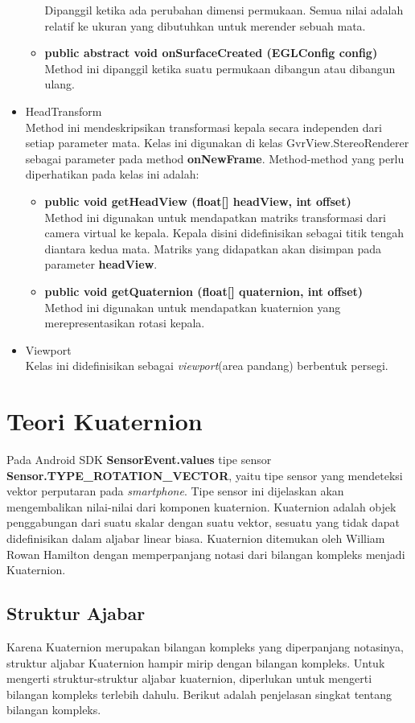 \begin{itemize}
\begin{itemize}
	Dipanggil ketika ada perubahan dimensi permukaan. Semua nilai adalah relatif ke ukuran yang dibutuhkan untuk merender sebuah mata.
	\item \textbf{public abstract void onSurfaceCreated (EGLConfig config)}\\
	Method ini dipanggil ketika suatu permukaan dibangun atau dibangun ulang.
\end{itemize}
\item HeadTransform\\
	Method ini mendeskripsikan transformasi kepala secara independen dari setiap parameter mata. Kelas ini digunakan di kelas GvrView.StereoRenderer sebagai parameter pada method \textbf{onNewFrame}. Method-method yang perlu diperhatikan pada kelas ini adalah:
	\begin{itemize}
		\item \textbf{public void getHeadView (float[] headView, int offset)}\\
		Method ini digunakan untuk mendapatkan matriks transformasi dari camera virtual ke kepala. Kepala disini didefinisikan sebagai titik tengah diantara kedua mata. Matriks yang didapatkan akan disimpan pada parameter \textbf{headView}.
		\item \textbf{public void getQuaternion (float[] quaternion, int offset)}\\
		Method ini digunakan untuk mendapatkan kuaternion yang merepresentasikan rotasi kepala.
	\end{itemize}
	\item Viewport\\
	Kelas ini didefinisikan sebagai \textit{viewport}(area pandang) berbentuk persegi.
\end{itemize}
\section{Teori Kuaternion}
\label{sec:teori_quaternion}

Pada Android SDK \textbf{SensorEvent.values} \cite{android_developers} tipe sensor \textbf{Sensor.TYPE\_ROTATION\_VECTOR}, yaitu tipe sensor yang mendeteksi vektor perputaran pada \textit{smartphone}. Tipe sensor ini dijelaskan akan mengembalikan nilai-nilai dari komponen kuaternion. 
Kuaternion\cite{kuipers:1999} adalah objek penggabungan dari suatu skalar dengan suatu vektor, sesuatu yang tidak dapat didefinisikan dalam aljabar linear biasa. Kuaternion ditemukan oleh William Rowan Hamilton dengan memperpanjang notasi dari bilangan kompleks menjadi Kuaternion. 
\subsection{Struktur Ajabar}
Karena Kuaternion merupakan bilangan kompleks yang diperpanjang notasinya, struktur aljabar Kuaternion hampir mirip dengan bilangan kompleks. Untuk mengerti struktur-struktur aljabar kuaternion, diperlukan untuk mengerti  bilangan kompleks terlebih dahulu. Berikut adalah penjelasan singkat tentang bilangan kompleks. 


